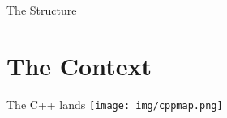 \documentclass[11pt]{beamer}
\begin{document}

\begin{frame}{The Structure}
\tableofcontents
\end{frame}


\section{The Context}

    
{
  \begin{frame}[plain]
  \end{frame}
}

\begin{frame}{The C++ lands}
\texttt{[image: img/cppmap.png]}
\end{frame}




\end{document}
